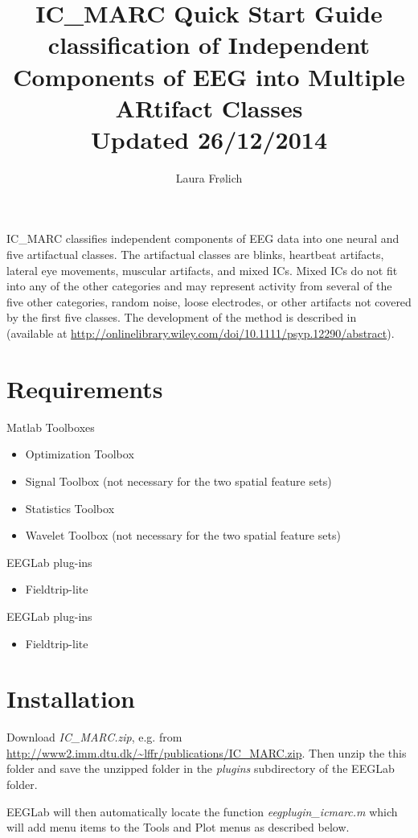 \documentclass[10pt, twoside, a4paper]{article}
\date{}
\author{Laura Fr{\o}lich}
\title{IC\_MARC Quick Start Guide\\
\small{classification of Independent Components of EEG into Multiple
  ARtifact Classes}\\\tiny{Updated 26/12/2014}}
\begin{document}
\maketitle

IC\_MARC classifies independent components of EEG data into one neural
and five artifactual classes. The artifactual classes are blinks,
heartbeat artifacts, lateral eye movements, muscular artifacts, and
mixed ICs. Mixed ICs do not fit into any of the other categories and
may represent activity from several of the five other categories,
random noise, loose electrodes, or other artifacts not covered by the
first five classes. The development of the method is described
in~\cite{fro14} (available at \url{http://onlinelibrary.wiley.com/doi/10.1111/psyp.12290/abstract}).

\section{Requirements}
Matlab Toolboxes
\begin{itemize}
\item Optimization Toolbox
\item Signal Toolbox (not necessary for the two spatial feature sets)
\item Statistics Toolbox
\item Wavelet Toolbox (not necessary for the two spatial feature sets)
\end{itemize}

EEGLab plug-ins
\begin{itemize}
\item Fieldtrip-lite
\end{itemize}

EEGLab plug-ins
\begin{itemize}
\item Fieldtrip-lite
\end{itemize}

\section{Installation}
Download \textit{IC\_MARC.zip}, e.g. from
\url{http://www2.imm.dtu.dk/~lffr/publications/IC_MARC.zip}. Then unzip the
this folder and save the unzipped folder in the \textit{plugins} subdirectory
of the EEGLab folder. 

EEGLab will then automatically locate the
function \textit{eegplugin\_icmarc.m} which will add menu items to the Tools and
Plot menus as described below.
\end{document}
